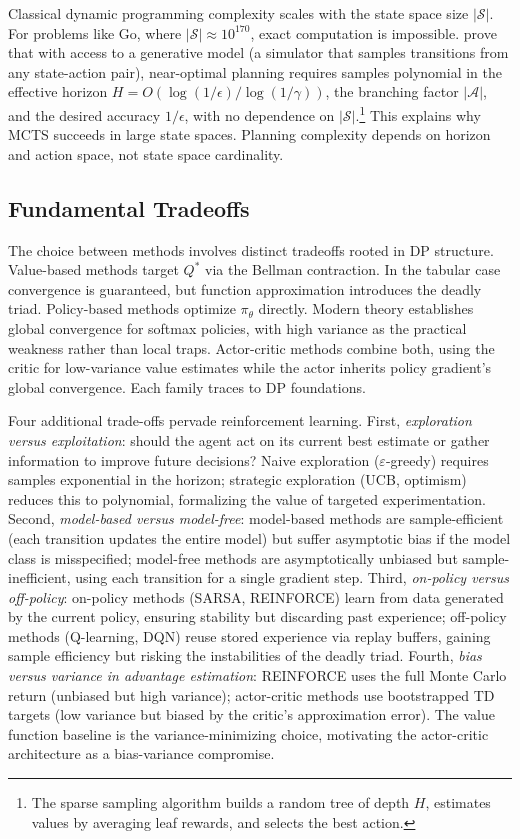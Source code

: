 Classical dynamic programming complexity scales with the state space size $|\mathcal{S}|$. For problems like Go, where $|\mathcal{S}| \approx 10^{170}$, exact computation is impossible. \citet{kearns2002} prove that with access to a generative model (a simulator that samples transitions from any state-action pair), near-optimal planning requires samples polynomial in the effective horizon $H = O(\log(1/\epsilon) / \log(1/\gamma))$, the branching factor $|\mathcal{A}|$, and the desired accuracy $1/\epsilon$, with no dependence on $|\mathcal{S}|$.\footnote{The sparse sampling algorithm builds a random tree of depth $H$, estimates values by averaging leaf rewards, and selects the best action.} This explains why MCTS succeeds in large state spaces. Planning complexity depends on horizon and action space, not state space cardinality.


\subsection{Fundamental Tradeoffs}
\label{sec:tradeoffs}

The choice between methods involves distinct tradeoffs rooted in DP structure. Value-based methods target $Q^*$ via the Bellman contraction. In the tabular case convergence is guaranteed, but function approximation introduces the deadly triad. Policy-based methods optimize $\pi_\theta$ directly. Modern theory \citep{agarwal2021theory} establishes global convergence for softmax policies, with high variance as the practical weakness rather than local traps. Actor-critic methods combine both, using the critic for low-variance value estimates while the actor inherits policy gradient's global convergence. Each family traces to DP foundations.

Four additional trade-offs pervade reinforcement learning. First, \emph{exploration versus exploitation}: should the agent act on its current best estimate or gather information to improve future decisions? Naive exploration ($\varepsilon$-greedy) requires samples exponential in the horizon; strategic exploration (UCB, optimism) reduces this to polynomial, formalizing the value of targeted experimentation. Second, \emph{model-based versus model-free}: model-based methods are sample-efficient (each transition updates the entire model) but suffer asymptotic bias if the model class is misspecified; model-free methods are asymptotically unbiased but sample-inefficient, using each transition for a single gradient step. 
Third, \emph{on-policy versus off-policy}: on-policy methods (SARSA, REINFORCE) learn from data generated by the current policy, ensuring stability but discarding past experience; off-policy methods (Q-learning, DQN) reuse stored experience via replay buffers, gaining sample efficiency but risking the instabilities of the deadly triad. Fourth, \emph{bias versus variance in advantage estimation}: REINFORCE uses the full Monte Carlo return (unbiased but high variance); actor-critic methods use bootstrapped TD targets (low variance but biased by the critic's approximation error). The value function baseline is the variance-minimizing choice, motivating the actor-critic architecture as a bias-variance compromise.


